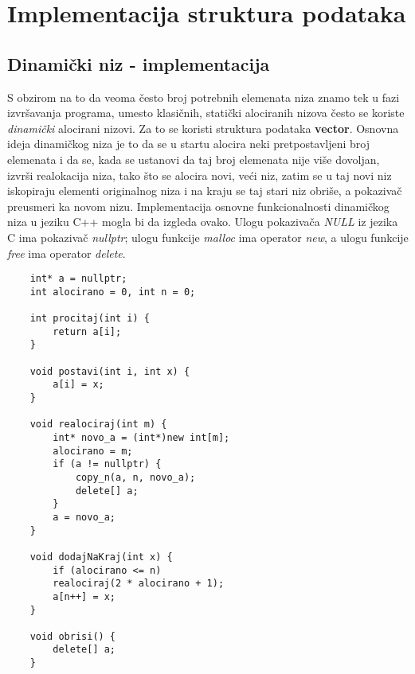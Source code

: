 \documentclass{article}
\begin{document}
\newpage

\section{Implementacija struktura podataka}
\subsection{Dinamički niz - implementacija}
S obzirom na to da veoma često broj potrebnih elemenata niza znamo tek u fazi
izvršavanja programa, umesto klasičnih, statički alociranih nizova često se koriste
\textit{dinamički} alocirani nizovi. Za to se koristi struktura
podataka \textbf{vector}. Osnovna ideja dinamičkog niza je to da se u startu alocira neki pretpostavljeni
broj elemenata i da se, kada se ustanovi da taj broj elemenata nije više dovoljan,
izvrši realokacija niza, tako što se alocira novi, veći niz, zatim se u taj novi
niz iskopiraju elementi originalnog niza i na kraju se taj stari niz obriše, a
pokazivač preusmeri ka novom nizu.
\newline Implementacija osnovne funkcionalnosti dinamičkog niza u jeziku C++ mogla bi
da izgleda ovako. Ulogu pokazivača \textit{NULL} iz jezika C ima pokazivač \textit{nullptr};
ulogu funkcije \textit{malloc} ima operator \textit{new}, a ulogu funkcije \textit{free} ima operator \textit{delete}.
\begin{lstlisting}
    int* a = nullptr;
    int alocirano = 0, int n = 0;
    
    int procitaj(int i) {
        return a[i];
    }
    
    void postavi(int i, int x) {
        a[i] = x;
    }
    
    void realociraj(int m) {
        int* novo_a = (int*)new int[m];
        alocirano = m;
        if (a != nullptr) {
            copy_n(a, n, novo_a);
            delete[] a;
        }
        a = novo_a;
    }
    
    void dodajNaKraj(int x) {
        if (alocirano <= n)
        realociraj(2 * alocirano + 1);
        a[n++] = x;
    }
    
    void obrisi() {
        delete[] a;
    }
\end{lstlisting}
\end{document}
